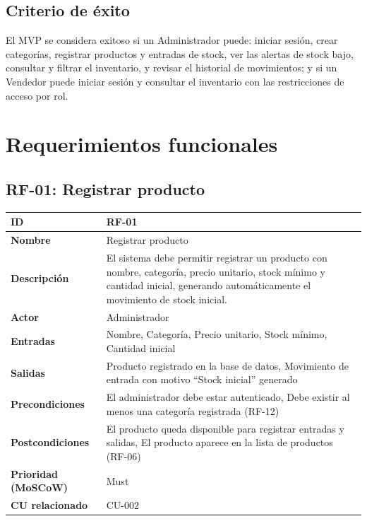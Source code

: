 \documentclass[12pt, a4paper]{article}
\begin{document}
\subsection{Criterio de éxito}
El MVP se considera exitoso si un Administrador puede: iniciar sesión, crear categorías, registrar
productos y entradas de stock, ver las alertas de stock bajo, consultar y filtrar el inventario, y
revisar el historial de movimientos; y si un Vendedor puede iniciar sesión y consultar el inventario
con las restricciones de acceso por rol.

\newpage

\section{Requerimientos funcionales}

\subsection{RF-01: Registrar producto}
\begin{center}
\renewcommand{\arraystretch}{1.4}
\begin{tabular}{|L{4cm}|L{12cm}|}
\hline
\textbf{ID} & RF-01 \\
\hline
\textbf{Nombre} & Registrar producto \\
\hline
\textbf{Descripción} & El sistema debe permitir registrar un producto con nombre, categoría, precio unitario, stock mínimo y cantidad inicial, generando automáticamente el movimiento de stock inicial. \\
\hline
\textbf{Actor} & Administrador \\
\hline
\textbf{Entradas} & Nombre, Categoría, Precio unitario, Stock mínimo, Cantidad inicial \\
\hline
\textbf{Salidas} & Producto registrado en la base de datos, Movimiento de entrada con motivo ``Stock inicial'' generado \\
\hline
\textbf{Precondiciones} & El administrador debe estar autenticado, Debe existir al menos una categoría registrada (RF-12) \\
\hline
\textbf{Postcondiciones} & El producto queda disponible para registrar entradas y salidas, El producto aparece en la lista de productos (RF-06) \\
\hline
\textbf{Prioridad (MoSCoW)} & Must \\
\hline
\textbf{CU relacionado} & CU-002 \\
\hline
\end{tabular}
\end{center}
\end{document}
